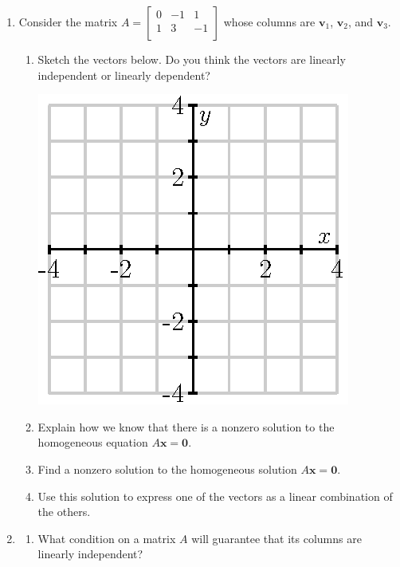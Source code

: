 \documentclass[12pt]{article}
\newcommand{\vs}[1]{\vspace{#1in}}
\newcommand{\vvec}{{\mathbf v}}
\newcommand{\xvec}{{\mathbf x}}
\newcommand{\zerovec}{{\mathbf 0}}
\begin{document}
\begin{enumerate}
\begin{enumerate}[label=(\alph*)]
    \vs{1}
  \end{enumerate}
  
\item Consider the matrix
  $A=
  \left[
    \begin{array}{ccc}
      0 & -1 & 1 \\
      1 & 3 & -1 \\
    \end{array}
  \right]
  $
  whose columns are $\vvec_1$, $\vvec_2$, and $\vvec_3$.

  \begin{enumerate}[label=(\alph*)]
  \item Sketch the vectors below.  Do you think the vectors are
    linearly independent or linearly dependent?
    
    \includegraphics{empty-4.eps}
    
  \item Explain how we know that there is a nonzero solution to the
    homogeneous equation $A\xvec=\zerovec$.
    
    \vs{1}
    
  \item Find a nonzero solution to the homogeneous solution
    $A\xvec=\zerovec$.
    
    \vs{1}
  \item Use this solution to express one of the vectors as a linear
    combination of the others.
    
    \vs{1}
  \end{enumerate}
  
\item
  \begin{enumerate}[label=(\alph*)]
  \item What condition on a matrix $A$ will guarantee that its columns
    are linearly independent?


\end{enumerate}
\end{enumerate}
\end{document}
